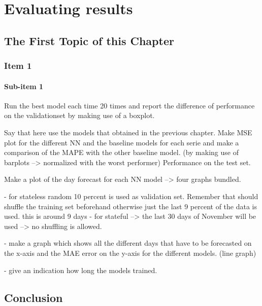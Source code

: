 \chapter{Evaluating results}
\label{cha:Evaluating results}


\section{The First Topic of this Chapter}
\subsection{Item 1}
\subsubsection{Sub-item 1}

Run the best model each time 20 times and report the difference of  performance on the validationset by making use of a boxplot. 


Say that here use the models that obtained in the previous chapter. Make MSE plot for the different NN and the baseline models for each serie and make a comparison of the MAPE with the other baseline model. (by making use of barplots --> normalized with the worst performer) Performance on the test set. 

Make a plot of the day forecast for each NN model --> four graphs bundled. 

- for stateless random 10 percent is used as validation set. Remember that should shuffle the training set beforehand otherwise just the last 9 percent of the data is used. this is around 9 days
- for stateful --> the last 30 days of November will be used --> no shuffling is allowed.

- make a graph which shows all the different days that have to be forecasted on the x-axis and the MAE error on the y-axis for the different models. (line graph)

- give an indication how long the models trained.


\section{Conclusion}
\lipsum[86-88]

